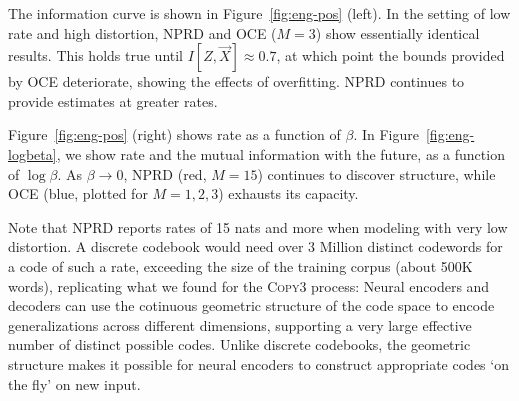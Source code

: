 \documentclass[11pt,letterpaper]{article}
\begin{document}
The information curve is shown in Figure~\ref{fig:eng-pos} (left).
In the setting of low rate and high distortion, NPRD and OCE ($M=3$) show essentially identical results.
This holds true until $I[Z, \overrightarrow{X}] \approx 0.7$, at which point the bounds provided by OCE deteriorate, showing the effects of overfitting.
NPRD continues to provide estimates at greater rates.

Figure~\ref{fig:eng-pos} (right) shows rate as a function of $\beta$.
In Figure~\ref{fig:eng-logbeta}, we show rate and the mutual information with the future, as a function of $\log \beta$.
As $\beta \rightarrow 0$, NPRD (red, $M=15$) continues to discover structure, while OCE (blue, plotted for $M=1,2,3$) exhausts its capacity.

Note that NPRD reports rates of 15 nats and more when modeling with very low distortion.
A discrete codebook would need over 3 Million distinct codewords for a code of such a rate, exceeding the size of the training corpus (about 500K words), replicating what we found for the \textsc{Copy3} process:
Neural encoders and decoders can use the cotinuous geometric structure of the code space to encode generalizations across different dimensions, supporting a very large effective number of distinct possible codes.
Unlike discrete codebooks, the geometric structure makes it possible for neural encoders to construct appropriate codes `on the fly' on new input.



\end{document}
